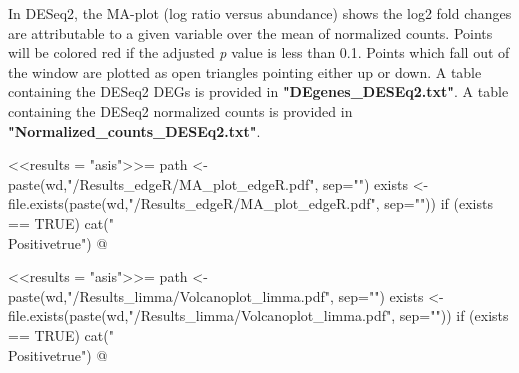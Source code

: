 \documentclass{article}
\begin{document}
    In DESeq2, the MA-plot (log ratio versus abundance) shows the log2 fold changes are attributable to a given variable over the mean of normalized counts. Points will be colored red if the adjusted \emph{p} value is less than 0.1. Points which fall out of the window are plotted as open triangles pointing either up or down.
    \newline
    A table containing the DESeq2 DEGs is provided in {\bf"DEgenes\_DESEq2.txt"}.
    \newline
    A table containing the DESeq2 normalized counts is provided in {\bf"Normalized\_counts\_DESEq2.txt"}.

\fi



\newif\ifPositive

<<results = "asis">>=
path <- paste(wd,"/Results_edgeR/MA_plot_edgeR.pdf", sep="")
exists <- file.exists(paste(wd,"/Results_edgeR/MA_plot_edgeR.pdf", sep=""))
if (exists == TRUE) {
  cat("\\Positivetrue")
}
@

\ifPositive
  \subsection{edgeR MA plot}

    This is the MA plot from DESeq2 package (Image extracted from {\bf"MA\_plot\_edgeR.pdf"} file):
    \begin{center}
      \texttt{[image: \\Sexpr\{path]}}
    \end{center}

    Differential gene expression data can be visualized as MA-plots (log ratio versus abundance) where each dot represents a gene. The differentially expressed genes are colored red and the non-differentially expressed ones are colored black.  
    \newline
    A table containing the edgeR DEGs is provided in {\bf"DEgenes\_edgeR.txt"}.
    \newline
    A table containing the edgeR normalized counts is provided in {\bf"Normalized\_counts\_edgeR.txt"}.

\fi




\newif\ifPositive

<<results = "asis">>=
path <- paste(wd,"/Results_limma/Volcanoplot_limma.pdf", sep="")
exists <- file.exists(paste(wd,"/Results_limma/Volcanoplot_limma.pdf", sep=""))
if (exists == TRUE) {
  cat("\\Positivetrue")
}
@
\end{document}
